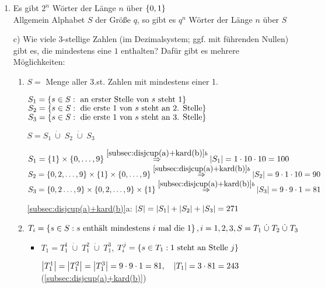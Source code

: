 \begin{enumerate}
	\item
	Es gibt $2^n$ Wörter der Länge $n$ über $\left\{0,1\right\}$
	\\ Allgemein Alphabet $S$ der Größe $q$, so gibt es $q^n$ Wörter der Länge $n$ über $S$
	
	\item[c)] Wie viele 3-stellige Zahlen (im Dezimalsystem; ggf. mit führenden Nullen) gibt es, die mindestens eine $1$ enthalten?
	Dafür gibt es mehrere\textbf{} Möglichkeiten:
	\begin{enumerate} %
		\item $S =$ Menge aller 3.st. Zahlen mit mindestens einer 1.
		
		$S_1 = \left\{s \in S : \text{ an erster Stelle von } s \text{ steht } 1\right\}$
		\\$S_2 = \left\{s \in S : \text{ die erste 1 von } s \text{ steht an 2. Stelle}\right\}$
		\\$S_3 = \left\{s \in S : \text{ die erste 1 von } s \text{ steht an 3. Stelle}\right\}$
		
		$S = S_1\: \dot{\cup}\; S_2 \;\dot{\cup}\; S_3$ 
		
		$S_1 = \left\{1\right\} \times \left\{0, \dots, 9\right\} \stackrel{\ref{subsec:disjcup(a)+kard(b)}b}{\Rightarrow} 
		\left|S_1\right| = 1 \cdot 10 \cdot 10 = 100$
		\\
		$S_2 = \left\{0, 2, \dots, 9\right\} \times \left\{1\right\} \times \left\{0, \dots, 9\right\} 
		\stackrel{\ref{subsec:disjcup(a)+kard(b)}b}{\Rightarrow} 
		\left|S_2\right| = 9\cdot 1 \cdot 10 = 90$
		\\
		$S_3 = \left\{0, 2 \dots, 9\right\} \times \left\{0, 2, \dots, 9\right\} \times \left\{1\right\}
		\stackrel{\ref{subsec:disjcup(a)+kard(b)}b}{\Rightarrow} 
		\left|S_3\right| = 9 \cdot 9 \cdot 1 = 81$
		
		\ref{subsec:disjcup(a)+kard(b)}a: \quad 
		$\left|S\right| = \left|S_1\right| + \left|S_2\right| + \left|S_3\right| = 271$
		
		\item 
		$T_i = \left\{s \in S : s \text{ enthält mindestens } i \text{ mal die 1}\right\}, i = 1, 2, 3, S = T_1 \;\dot{\cup}\; T_2 \;\dot{\cup}\; T_3$ 
		
		\begin{itemize}		
		
		\item $T_1 = T_1^1 \;\dot{\cup}\; T_1^2 \;\dot{\cup}\; T_1^3$,
	    \; $T_i^j = \left\{s \in T_1 : 1 \text{ steht an Stelle } j\right\}$
	   
	    $\left|T_1^1\right| = \left|T_1^2\right| = \left|T_1^3\right| = 9 \cdot 9 \cdot 1 = 81, 
	    \quad \left|T_1\right| = 3 \cdot 81 = 243$ (\ref{subsec:disjcup(a)+kard(b)}) 
	    

\end{itemize}
\end{enumerate}
\end{enumerate}
